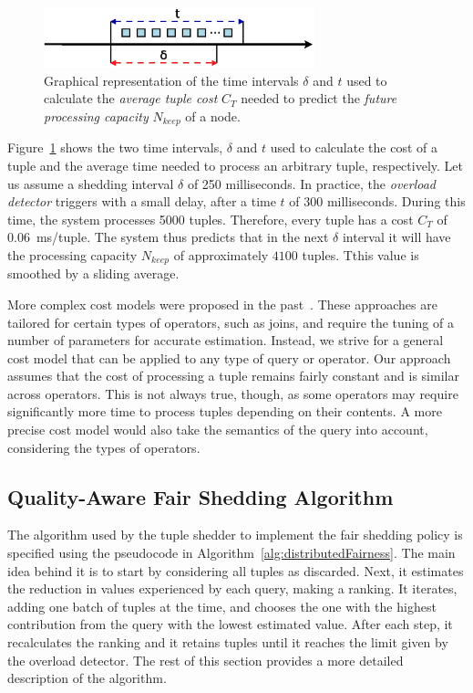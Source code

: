 \begin{figure}  
	\centering
	\includegraphics[width=0.7\textwidth]{img/tesi/tuple_cost} 
	\caption{Graphical representation of the time intervals $\delta$ and $t$ used to calculate the
	\emph{average tuple cost} $C_T$ needed to predict the \emph{future processing capacity}
	$N_{keep}$ of a node.}
	\label{fig:tuple_cost}
\end{figure} 

Figure~\ref{fig:tuple_cost} shows the two time intervals, $\delta$ and $t$ used to calculate the cost of
a tuple and the average time needed to process an arbitrary tuple, respectively. Let us assume a shedding
interval $\delta$ of 250 milliseconds. In practice, the \emph{overload detector} triggers with a small
delay, \eg after a time $t$ of 300 milliseconds. During this time, the system processes 5000 tuples.
Therefore, every tuple has a cost $C_T$ of $0.06$~ms/tuple. The system thus predicts that in the next $\delta$ interval it will
have the processing capacity $N_{keep}$ of approximately  $4100$ tuples. Tthis value is
smoothed by a sliding average.

More complex cost models were proposed in the past~\cite{expensivepredicatejoin07,
evaluatingwindow03}. These approaches are tailored for certain types of operators, such as joins, and
require the tuning of a number of parameters for accurate estimation. Instead, we strive for a general
cost model that can be applied to any type of query or operator. Our approach assumes that the cost of processing a tuple
remains fairly constant and is similar across operators. This is not always true, though, as some
operators may require significantly more time to process tuples depending on their contents. A
more precise cost model would also take the semantics of the query into account, \eg considering the
types of operators. 

\subsection*{Quality-Aware Fair Shedding Algorithm}
\label{sec:fairness-algo}

The algorithm used by the tuple shedder to implement the fair shedding policy is specified using the
pseudocode in Algorithm~\ref{alg:distributedFairness}. The main idea behind it is to start by considering
all tuples as discarded. Next, it estimates the reduction in \sic values experienced by each query,
making a ranking. It iterates, adding one batch of tuples at the time, and chooses the one with the
highest \sic contribution from the query with the lowest estimated \sic value. After each step, it
recalculates the ranking and it retains tuples until it reaches the limit given by the overload
detector. The rest of this section provides a more detailed description of the algorithm.

